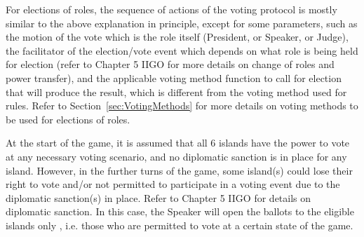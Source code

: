 For elections of roles, the sequence of actions of the voting protocol is mostly similar to the above explanation in principle, except for some parameters, such as the motion of the vote which is the role itself (President, or Speaker, or Judge), the facilitator of the election/vote event which depends on what role is being held for election (refer to Chapter 5 IIGO for more details on change of roles and power transfer), and the applicable voting method function to call for election that will produce the result, which is different from the voting method used for rules. Refer to Section~\ref{sec:VotingMethods} for more details on voting methods to be used for elections of roles.

At the start of the game, it is assumed that all 6 islands have the power to vote at any necessary voting scenario, and no diplomatic sanction is in place for any island. However, in the further turns of the game, some island(s) could lose their right to vote and/or not permitted to participate in a voting event due to the diplomatic sanction(s) in place. Refer to Chapter 5 IIGO for details on diplomatic sanction. In this case, the Speaker will open the ballots to the eligible islands only , i.e. those who are permitted to vote at a certain state of the game.

